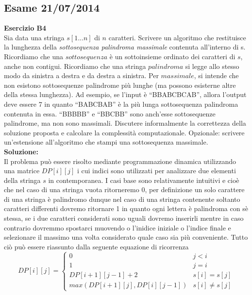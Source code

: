 \documentclass[../cheatSheetAlgoritmi.tex]{subfiles}
\begin{document}
\subsection{Esame 21/07/2014}
\textbf{Esercizio B4}\\
Sia data una stringa $s[1...n]$ di $n$ caratteri. Scrivere un algoritmo che restituisce la lunghezza della \emph{sottosequenza palindroma massimale} contenuta all’interno di s. Ricordiamo che una $sottosequenza$ è un sottoinsieme ordinato dei caratteri di $s$, anche non contigui. Ricordiamo che una stringa $palindroma$ si legge allo stesso modo da sinistra a destra e da destra a sinistra. Per $massimale$, si intende che non esistono sottosequenze palindrome più lunghe (ma possono esisterne altre della stessa lunghezza). Ad esempio, se l'input è “BBABCBCAB”, allora l’output deve essere 7 in quanto “BABCBAB” è la più lunga sottosequenza palindroma contenuta in essa. “BBBBB” e “BBCBB” sono anch’esse sottosequenze palindrome, ma non sono massimali. Discutere informalmente la correttezza della soluzione proposta e calcolare la complessità computazionale. Opzionale: scrivere un'estensione all'algoritmo che stampi una sottosequenza massimale.\\
\textbf{Soluzione:}\\
Il problema può essere risolto mediante programmazione dinamica utilizzando una matrice $DP[i][j]$ i cui indici sono utilizzati per analizzare due elementi della stringa $s$ in contemporanea. I casi base sono relativamente intuitivi e cioè che nel caso di una stringa vuota ritorneremo 0, per definizione un solo carattere di una stringa è palindromo dunque nel caso di una stringa contenente soltanto caratteri differenti dovremo ritornare 1 in quanto ogni lettera è palindroma con sè stessa, se i due caratteri considerati sono uguali dovremo inserirli mentre in caso contrario dovremmo spostarci muovendo o l'inidice iniziale o l'indice finale e selezionare il massimo una volta considerato quale caso sia più conveniente. Tutto ciò può essere riassunto dalla seguente equazione di ricorrenza
\begin{equation*}
  	DP[i][j]=\begin{cases}
  		0 & \text{$j < i$}\\
  		1 & \text{$j = i$}\\
  		DP[i+1][j-1] + 2 &\text{$s[i] = s[j]$}\\
  		max(DP[i+1][j], DP[i][j-1]) & \text{$s[i] \neq s[j]$}
  	\end{cases}
\end{equation*}
\end{document}
